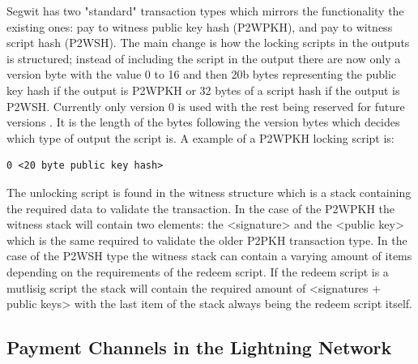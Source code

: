 Segwit has two "standard" transaction types which mirrors the functionality the existing ones: pay to witness public key hash (P2WPKH), and pay to witness script hash (P2WSH). The main change is how the locking scripts in the outputs is structured; instead of including the script in the output there are now only a version byte with the value 0 to 16 and then 20b bytes representing the public key hash if the output is P2WPKH or 32 bytes of a script hash if the output is P2WSH. Currently only version 0 is used with the rest being reserved for future versions \cite{BIP141}. It is the length of the bytes following the version bytes which decides which type of output the script is. A example of a P2WPKH locking script is:

\begin{verbatim}
0 <20 byte public key hash>
\end{verbatim}

The unlocking script is found in the witness structure which is a stack containing the required data to validate the transaction.
In the case of the P2WPKH the witness stack will contain two elements: the <signature> and the <public key> which is the same required to validate the older P2PKH transaction type. In the case of the P2WSH type the witness stack can contain a varying amount of items depending on the requirements of the redeem script. If the redeem script is a mutlisig script the stack will contain the required amount of <signatures + public keys> with the last item of the stack always being the redeem script itself.

\subsection{Payment Channels in the Lightning Network} 
\label{subsec:pcln}

